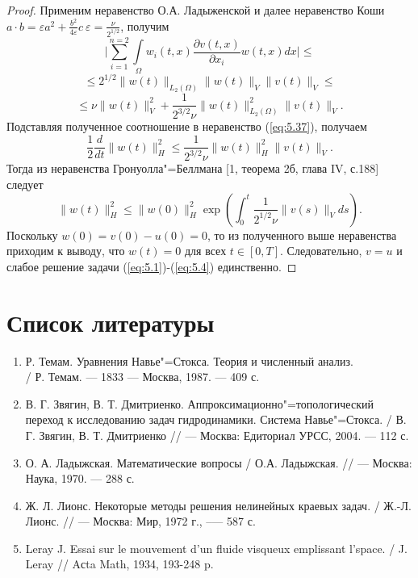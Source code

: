 \begin{proof}
    Применим неравенство О.А. Ладыженской и далее неравенство Коши \linebreak
    $a\cdot b=\varepsilon a^2+\frac{b^2}{4\varepsilon}c \ \varepsilon=\frac{\nu}{2^{1/2}}$, получим
    $$\bigg|\sum_{i=1}^{n=2}\int\limits_\Omega w_i(t, x)\frac{\partial v(t, x)}{\partial x_i}w(t, x)dx\bigg|\le$$
    $$\le 2^{1/2}\| w(t)\|_{L_2(\Omega)}\| w(t)\|_V\| v(t)\|_V\le$$
    $$\le \nu\| w(t)\|_V^2+\frac{1}{2^{3/2}\nu}\| w(t)\|_{L_2(\Omega)}^2\| v(t)\|_V.$$
    Подставляя полученное соотношение в неравенство (\ref{eq:5.37}), получаем
    $$\frac{1}{2}\frac{d}{dt}\| w(t)\|_H^2\le\frac{1}{2^{3/2}\nu}\| w(t)\|_H^2\| v(t)\|_V.$$
    Тогда из неравенства Гронуолла"=Беллмана [1, теорема 2б, глава IV, с.188] следует
    $$\| w(t)\|_H^2\le\| w(0)\|_H^2\exp\left(\int_0^t\frac{1}{2^{1/2}\nu}\| v(s)\|_Vds\right).$$
    Поскольку $w(0) = v(0)- u(0) = 0$, то из полученного выше неравенства приходим к выводу,
    что $w(t)=0$ для всех $t\in[0, T]$. Следовательно, $v=u$ и слабое решение задачи (\ref{eq:5.1})-(\ref{eq:5.4}) единственно.
\end{proof}


\clearpage
\section*{Список литературы}
\begin{enumerate}
    \item Р. Темам. Уравнения Навье"=Стокса. Теория и численный анализ.\\ / Р. Темам. --- 1833 --- Москва, 1987. --- 409 с.
    \item В. Г. Звягин, В. Т. Дмитриенко. Аппроксимационно"=топологический переход к исследованию задач гидродинамики.
    Система Навье"=Стокса. / В. Г. Звягин, В. Т. Дмитриенко // --- Москва: Едиториал УРСС, 2004. --- 112 с.
    \item О. А. Ладыжская. Математические вопросы / О.А. Ладыжская. // --- Москва: Наука, 1970. --- 288 с.
    \item Ж. Л. Лионс. Некоторые методы решения нелинейных краевых задач. /  Ж.-Л. Лионс. // --- Москва: Мир, 1972 г., --— 587 с.
    \item Leray J. Essai sur le mouvement d’un fluide visqueux emplissant l’space. / J. Leray // Aсta Math, 1934, 193-248 p.
\end{enumerate}
